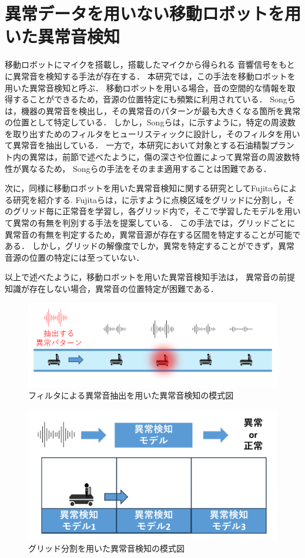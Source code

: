\documentclass[../main]{subfiles}
\begin{document}
\section{異常データを用いない移動ロボットを用いた異常音検知}
\label{sec:related_work_mobile}

移動ロボットにマイクを搭載し，搭載したマイクから得られる
音響信号をもとに異常音を検知する手法が存在する．
本研究では，この手法を移動ロボットを用いた異常音検知と呼ぶ．
移動ロボットを用いる場合，音の空間的な情報を取得することができるため，音源の位置特定にも頻繁に利用されている．
Songらは，機器の異常音を検出し，その異常音のパターンが最も大きくなる箇所を異常の位置として特定している\cite{9023943}．
しかし，Songらは，に示すように，特定の周波数を取り出すためのフィルタをヒューリスティックに設計し，そのフィルタを用いて異常音を抽出している．
一方で，本研究において対象とする石油精製プラント内の異常は，前節で述べたように，傷の深さや位置によって異常音の周波数特性が異なるため，
Songらの手法をそのまま適用することは困難である．

次に，同様に移動ロボットを用いた異常音検知に関する研究としてFujitaらによる研究を紹介する\cite{10202270}.
Fujitaらは，に示すように点検区域をグリッドに分割し，そのグリッド毎に正常音を学習し，各グリッド内で，そこで学習したモデルを用いて異常の有無を判別する手法を提案している．
この手法では，グリッドごとに異常音の有無を判定するため，異常音源が存在する区間を特定することが可能である．
しかし，グリッドの解像度でしか，異常を特定することができず，異常音源の位置の特定には至っていない．

以上で述べたように，移動ロボットを用いた異常音検知手法は，
異常音の前提知識が存在しない場合，異常音の位置特定が困難である．

\begin{figure}[t]
  \centering
  \includegraphics[keepaspectratio, width=1.0\linewidth]{chap2/supervised_prev_research.png}
  \caption{フィルタによる異常音抽出を用いた異常音検知の模式図}
  \label{fig:supervised_prev_research}
\end{figure}

\begin{figure}[t]
  \centering
  \includegraphics[keepaspectratio, width=1.0\linewidth]{chap2/fujita_previous_research.png}
  \caption{グリッド分割を用いた異常音検知の模式図}
  \label{fig:fujita_previous_research}
\end{figure}
\end{document}

